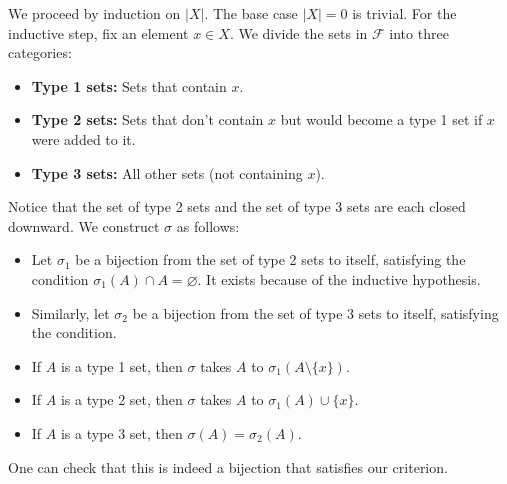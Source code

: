\documentclass[11pt]{scrartcl}
\begin{document}
We proceed by induction on $\left\lvert X \right\rvert$.
The base case $\left\lvert X \right\rvert = 0$ is trivial.
For the inductive step, fix an element $x \in X$.
We divide the sets in $\mathcal F$ into three categories:
\begin{itemize}
  \item \textbf{Type 1 sets:} Sets that contain $x$.
  \item \textbf{Type 2 sets:} Sets that don't contain $x$ but
  would become a type 1 set if $x$ were added to it.
  \item \textbf{Type 3 sets:} All other sets (not containing $x$).
\end{itemize}
Notice that the set of type 2 sets and the set of type 3 sets are each closed downward.
We construct $\sigma$ as follows:
\begin{itemize}
  \item Let $\sigma_1$ be a bijection from the set of type 2 sets to itself,
  satisfying the condition $\sigma_1(A) \cap A = \varnothing$. It exists
  because of the inductive hypothesis.
  \item Similarly, let $\sigma_2$ be a bijection from the set of type 3 sets to itself,
  satisfying the condition.
  \item If $A$ is a type 1 set, then $\sigma$ takes $A$ to $\sigma_1(A \setminus \{x\})$.
  \item If $A$ is a type 2 set, then $\sigma$ takes $A$ to $\sigma_1(A) \cup \{x\}$.
  \item If $A$ is a type 3 set, then $\sigma(A) = \sigma_2(A)$.
\end{itemize}
One can check that this is indeed a bijection that satisfies our criterion.

\end{document}

